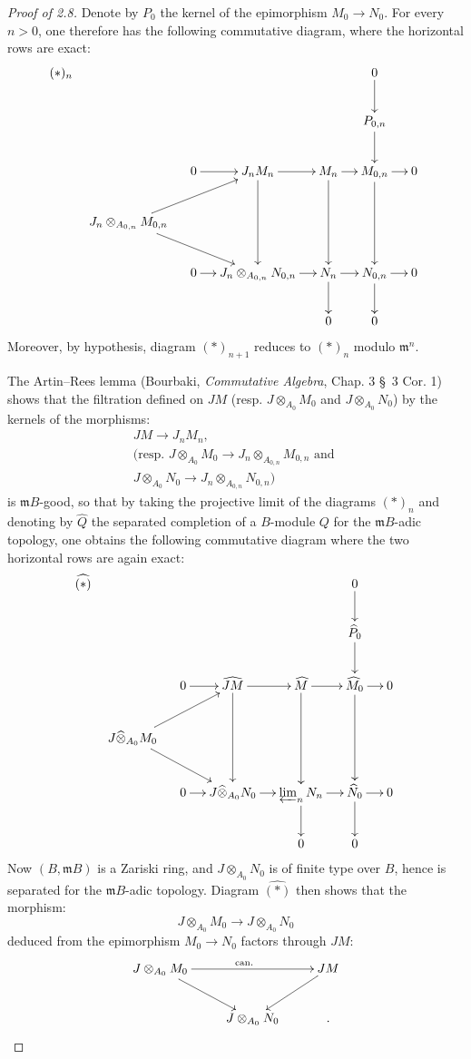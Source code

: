 \begin{proof}[Proof of 2.8]
Denote by $P_0$ the kernel of the epimorphism $M_0\to N_0$. For every $n>0$, one therefore has the following commutative diagram, where the horizontal rows are exact:
\[
(\ast)_n\quad\xymatrix@C=12pt{
&&&&0\ar[d]&\\
&&&&P_{0,n}\ar[d]&\\
&0\ar[r]&J_nM_n\ar[r]\ar[dd]&M_n\ar[r]\ar[dd]&M_{0,n}\ar[r]\ar[dd]&0\\
J_n\otimes_{A_{0,n}}M_{0,n}\ar[urr]\ar[drr]&&&&&\\
&0\ar[r]&J_n\otimes_{A_{0,n}}N_{0,n}\ar[r]&N_n\ar[r]\ar[d]&N_{0,n}\ar[r]\ar[d]&0\\
&&&0&0&
}
\]
Moreover, by hypothesis, diagram $(\ast)_{n+1}$ reduces to $(\ast)_n$ modulo $\mathfrak m^n$.

The Artin--Rees lemma (Bourbaki, \textit{Commutative Algebra}, Chap. 3 \S~3 Cor. 1) shows that the filtration defined on $JM$ (resp. $J\otimes_{A_0}M_0$ and $J\otimes_{A_0}N_0$) by the kernels of the morphisms:
\[
\begin{gathered}
JM\to J_nM_n,\\
\text{(resp. }J\otimes_{A_0}M_0\to J_n\otimes_{A_{0,n}}M_{0,n}\text{ and }\\
J\otimes_{A_0}N_0\to J_n\otimes_{A_{0,n}}N_{0,n}\text{)}
\end{gathered}
\]
is $\mathfrak mB$-good, so that by taking the projective limit of the diagrams $(\ast)_n$ and denoting by $\widehat Q$ the separated completion of a $B$-module $Q$ for the $\mathfrak mB$-adic topology, one obtains the following commutative diagram where the two horizontal rows are again exact:
\[
\widehat{(\ast)}\quad\xymatrix@C=12pt{
&&&&0\ar[d]&\\
&&&&\widehat P_0\ar[d]&\\
&0\ar[r]&\widehat{JM}\ar[r]\ar[dd]&\widehat M\ar[r]\ar[dd]&\widehat M_0\ar[r]\ar[dd]&0\\
J\widehat\otimes_{A_0}M_0\ar[urr]\ar[drr]&&&&&\\
&0\ar[r]&J\widehat\otimes_{A_0}N_0\ar[r]&\varprojlim_n N_n\ar[r]\ar[d]&\widehat N_0\ar[r]\ar[d]&0\\
&&&0&0&
}
\]
Now $(B,\mathfrak mB)$ is a Zariski ring, and $J\otimes_{A_0}N_0$ is of finite type over $B$, hence is separated for the $\mathfrak mB$-adic topology. Diagram $\widehat{(\ast)}$ then shows that the morphism:
\[
J\otimes_{A_0}M_0\to J\otimes_{A_0}N_0
\]
deduced from the epimorphism $M_0\to N_0$ factors through $JM$:
\[
\xymatrix{J\otimes_{A_0}M_0\ar[rr]^{\mathrm{can.}}\ar[dr]&&JM\ar[dl]\\&J\otimes_{A_0}N_0&.}
\]
\end{proof}
